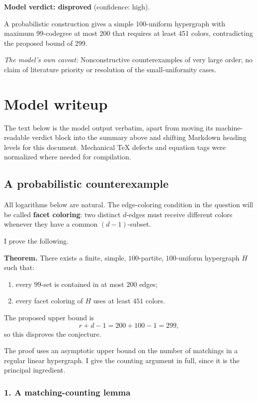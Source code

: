 \documentclass[
  11pt,
  a4paper,
]{article}
\providecommand{\tightlist}{%
  \setlength{\itemsep}{0pt}\setlength{\parskip}{0pt}}
\begin{document}
\textbf{Model verdict: disproved} (confidence: high).

A probabilistic construction gives a simple 100-uniform hypergraph with
maximum 99-codegree at most 200 that requires at least 451 colors,
contradicting the proposed bound of 299.

\emph{The model's own caveat:} Nonconstructive counterexamples of very
large order; no claim of literature priority or resolution of the
small-uniformity cases.

\section{Model writeup}\label{model-writeup}

The text below is the model output verbatim, apart from moving its
machine-readable verdict block into the summary above and shifting
Markdown heading levels for this document. Mechanical TeX defects and
equation tags were normalized where needed for compilation.

\subsection{A probabilistic
counterexample}\label{a-probabilistic-counterexample}

All logarithms below are natural. The edge-coloring condition in the
question will be called \textbf{facet coloring}: two distinct
\(d\)-edges must receive different colors whenever they have a common
\((d-1)\)-subset.

I prove the following.

\textbf{Theorem.} There exists a finite, simple, \(100\)-partite,
\(100\)-uniform hypergraph \(H\) such that:

\begin{enumerate}
\def\labelenumi{\arabic{enumi}.}
\tightlist
\item
  every \(99\)-set is contained in at most \(200\) edges;
\item
  every facet coloring of \(H\) uses at least \(451\) colors.
\end{enumerate}

The proposed upper bound is \[
r+d-1=200+100-1=299,
\] so this disproves the conjecture.

The proof uses an asymptotic upper bound on the number of matchings in a
regular linear hypergraph. I give the counting argument in full, since
it is the principal ingredient.

\subsubsection{1. A matching-counting
lemma}\label{a-matching-counting-lemma}
\end{document}
